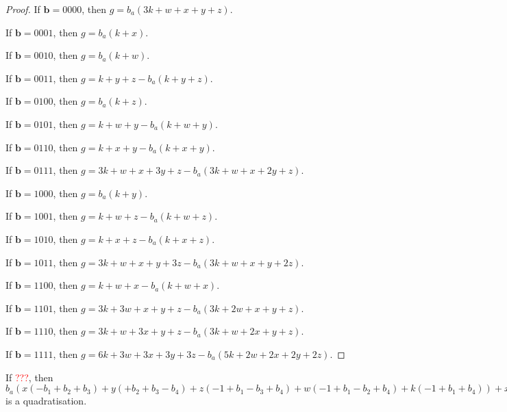 \documentclass[11pt]{scrartcl}
\newcommand{\vc}[1]{\boldsymbol{#1}}
\begin{document}
\begin{proof}
If $\vc b = 0000$, then $g = b_a(3k + w + x + y + z)$.

If $\vc b = 0001$, then $g = b_a(k + x)$.

If $\vc b = 0010$, then $g = b_a(k + w)$.

If $\vc b = 0011$, then $g = k + y + z - b_a(k + y + z)$.

If $\vc b = 0100$, then $g = b_a(k + z)$.

If $\vc b = 0101$, then $g = k + w + y - b_a(k + w + y)$.

If $\vc b = 0110$, then $g = k + x + y - b_a(k + x + y)$.

If $\vc b = 0111$, then $g = 3k + w + x + 3y + z - b_a(3k + w + x + 2y + z)$.

If $\vc b = 1000$, then $g = b_a(k + y)$.

If $\vc b = 1001$, then $g = k + w + z - b_a(k + w + z)$.

If $\vc b = 1010$, then $g = k + x + z - b_a(k + x + z)$.

If $\vc b = 1011$, then $g = 3k + w + x + y + 3z - b_a(3k + w + x + y + 2z)$.

If $\vc b = 1100$, then $g = k + w + x - b_a(k + w + x)$.

If $\vc b = 1101$, then $g = 3k + 3w + x + y + z - b_a(3k + 2w + x + y + z)$.

If $\vc b = 1110$, then $g = 3k + w + 3x + y + z - b_a(3k + w + 2x + y + z)$.

If $\vc b = 1111$, then $g = 6k + 3w + 3x + 3y + 3z - b_a(5k + 2w + 2x + 2y + 2z)$.

\end{proof}

\begin{lemma}
 If \textcolor{red}{???}, then $b_a(x(-b_1+b_2+b_3)+y(+b_2+b_3-b_4)+z(-1+b_1-b_3+b_4)+w(-1+b_1-b_2+b_4)+k(-1+b_1+b_4))+x(-b_2-b_3+b_1b_2+b_1b_3)+y(-b_2-b_3+b_2b_4+b_3b_4)+z(+1 -b_1+b_3-b_4+b_1b_4)+w(+1 -b_1+b_2-b_4+b_1b_4)+k(+1 -b_1-b_4+b_1b_4)$ is a quadratisation.\\
 \end{lemma}
\end{document}
